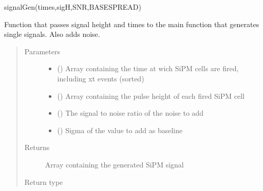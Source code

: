 \documentclass[letterpaper,10pt,english]{sphinxmanual}
\begin{document}
\begin{fulllineitems}
\label{\detokenize{structure:libs.lib.SiPMSignalAction}}
signalGen(times,sigH,SNR,BASESPREAD)

Function that passes signal height and times to the main function that
generates single signals. Also adds noise.
\begin{quote}\begin{description}
\item[{Parameters}] \leavevmode\begin{itemize}
\item {} 
 () \textendash{} Array containing the time at wich SiPM cells are fired, including xt events (sorted)

\item {} 
 () \textendash{} Array containing the pulse height of each fired SiPM cell

\item {} 
 () \textendash{} The signal to noise ratio of the noise to add

\item {} 
 () \textendash{} Sigma of the value to add as baseline

\end{itemize}

\item[{Returns}] \leavevmode
{} \textendash{} Array containing the generated SiPM signal

\item[{Return type}] \leavevmode
{}

\end{description}\end{quote}

\end{fulllineitems}

\end{document}
